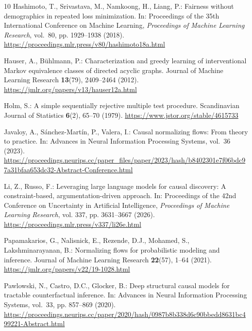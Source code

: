 \documentclass{svproc}
\begin{document}
\begin{thebibliography}{10}
Hashimoto, T., Srivastava, M., Namkoong, H., Liang, P.: Fairness without
  demographics in repeated loss minimization.
\newblock In: Proceedings of the 35th International Conference on Machine
  Learning, \emph{Proceedings of Machine Learning Research}, vol.~80, pp.
  1929--1938 (2018).
\newblock \urlprefix\url{https://proceedings.mlr.press/v80/hashimoto18a.html}

Hauser, A., B{\"u}hlmann, P.: Characterization and greedy learning of
  interventional {Markov} equivalence classes of directed acyclic graphs.
\newblock Journal of Machine Learning Research \textbf{13}(79), 2409--2464
  (2012).
\newblock \urlprefix\url{https://jmlr.org/papers/v13/hauser12a.html}

Holm, S.: A simple sequentially rejective multiple test procedure.
\newblock Scandinavian Journal of Statistics \textbf{6}(2), 65--70 (1979).
\newblock \urlprefix\url{https://www.jstor.org/stable/4615733}

Javaloy, A., S{\'a}nchez-Mart{\'i}n, P., Valera, I.: Causal normalizing flows:
  From theory to practice.
\newblock In: Advances in Neural Information Processing Systems, vol.~36
  (2023).
\newblock
  \urlprefix\url{https://proceedings.neurips.cc/paper_files/paper/2023/hash/b8402301e7f06bdc97a31bfaa653dc32-Abstract-Conference.html}

Li, Z., Russo, F.: Leveraging large language models for causal discovery: A
  constraint-based, argumentation-driven approach.
\newblock In: Proceedings of the 42nd Conference on Uncertainty in Artificial
  Intelligence, \emph{Proceedings of Machine Learning Research}, vol. 337, pp.
  3631--3667 (2026).
\newblock \urlprefix\url{https://proceedings.mlr.press/v337/li26e.html}

Papamakarios, G., Nalisnick, E., Rezende, D.J., Mohamed, S., Lakshminarayanan,
  B.: Normalizing flows for probabilistic modeling and inference.
\newblock Journal of Machine Learning Research \textbf{22}(57), 1--64 (2021).
\newblock \urlprefix\url{https://jmlr.org/papers/v22/19-1028.html}

Pawlowski, N., Castro, D.C., Glocker, B.: Deep structural causal models for
  tractable counterfactual inference.
\newblock In: Advances in Neural Information Processing Systems, vol.~33, pp.
  857--869 (2020).
\newblock
  \urlprefix\url{https://proceedings.neurips.cc/paper/2020/hash/0987b8b338d6c90bbedd8631bc499221-Abstract.html}


\end{thebibliography}
\end{document}
